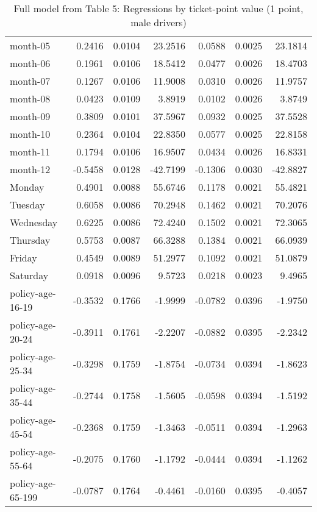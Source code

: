 \documentclass[10pt]{article}
\begin{document}
\begin{table}[ht]
\begin{tabular}{lrrrrrr}
  month-05 & 0.2416 & 0.0104 & 23.2516 & 0.0588 & 0.0025 & 23.1814 \\ 
  month-06 & 0.1961 & 0.0106 & 18.5412 & 0.0477 & 0.0026 & 18.4703 \\ 
  month-07 & 0.1267 & 0.0106 & 11.9008 & 0.0310 & 0.0026 & 11.9757 \\ 
  month-08 & 0.0423 & 0.0109 & 3.8919 & 0.0102 & 0.0026 & 3.8749 \\ 
  month-09 & 0.3809 & 0.0101 & 37.5967 & 0.0932 & 0.0025 & 37.5528 \\ 
  month-10 & 0.2364 & 0.0104 & 22.8350 & 0.0577 & 0.0025 & 22.8158 \\ 
  month-11 & 0.1794 & 0.0106 & 16.9507 & 0.0434 & 0.0026 & 16.8331 \\ 
  month-12 & -0.5458 & 0.0128 & -42.7199 & -0.1306 & 0.0030 & -42.8827 \\ 
  Monday & 0.4901 & 0.0088 & 55.6746 & 0.1178 & 0.0021 & 55.4821 \\ 
  Tuesday & 0.6058 & 0.0086 & 70.2948 & 0.1462 & 0.0021 & 70.2076 \\ 
  Wednesday & 0.6225 & 0.0086 & 72.4240 & 0.1502 & 0.0021 & 72.3065 \\ 
  Thursday & 0.5753 & 0.0087 & 66.3288 & 0.1384 & 0.0021 & 66.0939 \\ 
  Friday & 0.4549 & 0.0089 & 51.2977 & 0.1092 & 0.0021 & 51.0879 \\ 
  Saturday & 0.0918 & 0.0096 & 9.5723 & 0.0218 & 0.0023 & 9.4965 \\ 
  policy-age-16-19 & -0.3532 & 0.1766 & -1.9999 & -0.0782 & 0.0396 & -1.9750 \\ 
  policy-age-20-24 & -0.3911 & 0.1761 & -2.2207 & -0.0882 & 0.0395 & -2.2342 \\ 
  policy-age-25-34 & -0.3298 & 0.1759 & -1.8754 & -0.0734 & 0.0394 & -1.8623 \\ 
  policy-age-35-44 & -0.2744 & 0.1758 & -1.5605 & -0.0598 & 0.0394 & -1.5192 \\ 
  policy-age-45-54 & -0.2368 & 0.1759 & -1.3463 & -0.0511 & 0.0394 & -1.2963 \\ 
  policy-age-55-64 & -0.2075 & 0.1760 & -1.1792 & -0.0444 & 0.0394 & -1.1262 \\ 
  policy-age-65-199 & -0.0787 & 0.1764 & -0.4461 & -0.0160 & 0.0395 & -0.4057 \\ 
   \hline
\end{tabular}
\caption{Full model from Table 5: Regressions by ticket-point value (1 point, male drivers)} 
\label{tab_5_1_pts_M}
\end{table}
\end{document}
